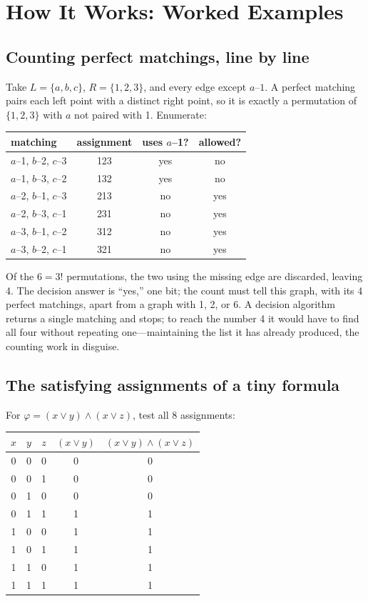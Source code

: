 \section{How It Works: Worked Examples}
\subsection{Counting perfect matchings, line by line}
Take \(L=\{a,b,c\}\), \(R=\{1,2,3\}\), and every edge except \(a\)--\(1\). A perfect matching pairs each left point with a distinct right point, so it is exactly a permutation of \(\{1,2,3\}\) with \(a\) not paired with 1. Enumerate:

\begin{center}
\begin{tabular}{lccc}
\toprule
matching & assignment & uses \(a\)--1? & allowed? \\
\midrule
\(a\)--1, \(b\)--2, \(c\)--3 & 123 & yes & no \\
\(a\)--1, \(b\)--3, \(c\)--2 & 132 & yes & no \\
\(a\)--2, \(b\)--1, \(c\)--3 & 213 & no & yes \\
\(a\)--2, \(b\)--3, \(c\)--1 & 231 & no & yes \\
\(a\)--3, \(b\)--1, \(c\)--2 & 312 & no & yes \\
\(a\)--3, \(b\)--2, \(c\)--1 & 321 & no & yes \\
\bottomrule
\end{tabular}
\end{center}

Of the \(6=3!\) permutations, the two using the missing edge are discarded, leaving 4. The decision answer is ``yes,'' one bit; the count must tell this graph, with its 4 perfect matchings, apart from a graph with 1, 2, or 6. A decision algorithm returns a single matching and stops; to reach the number 4 it would have to find all four without repeating one---maintaining the list it has already produced, the counting work in disguise.

\subsection{The satisfying assignments of a tiny formula}
For \(\varphi=(x\vee y)\wedge(x\vee z)\), test all 8 assignments:

\begin{center}
\begin{tabular}{ccccc}
\toprule
\(x\) & \(y\) & \(z\) & \((x\vee y)\) & \((x\vee y)\wedge(x\vee z)\) \\
\midrule
0 & 0 & 0 & 0 & 0 \\
0 & 0 & 1 & 0 & 0 \\
0 & 1 & 0 & 0 & 0 \\
0 & 1 & 1 & 1 & 1 \\
1 & 0 & 0 & 1 & 1 \\
1 & 0 & 1 & 1 & 1 \\
1 & 1 & 0 & 1 & 1 \\
1 & 1 & 1 & 1 & 1 \\
\bottomrule
\end{tabular}
\end{center}

